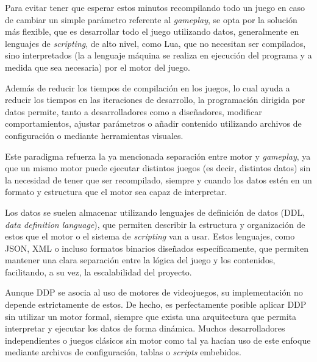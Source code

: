 \smallskip

Para evitar tener que esperar estos minutos recompilando todo un juego en caso de cambiar un simple parámetro referente al \textit{gameplay}, se opta por la solución más flexible, que es desarrollar todo el juego utilizando datos, generalmente en lenguajes de \textit{scripting}, de alto nivel, como Lua, que no necesitan ser compilados, sino interpretados (la  a lenguaje máquina se realiza en ejecución del programa y a medida que sea necesaria) por el motor del juego.

\medskip

Además de reducir los tiempos de compilación en los juegos, lo cual ayuda a reducir los tiempos en las iteraciones de desarrollo, la programación dirigida por datos permite, tanto a desarrolladores como a diseñadores, modificar comportamientos, ajustar parámetros o añadir contenido utilizando archivos de configuración o mediante herramientas visuales.

\medskip

Este paradigma refuerza la ya mencionada separación entre motor y \textit{gameplay}, ya que un mismo motor puede ejecutar distintos juegos (es decir, distintos datos) sin la necesidad de tener que ser recompilado, siempre y cuando los datos estén en un formato y estructura que el motor sea capaz de interpretar.

\medskip

Los datos se suelen almacenar utilizando lenguajes de definición de datos (DDL, \textit{data definition language}), que permiten describir la estructura y organización de estos que el motor o el sistema de \textit{scripting} van a usar. Estos lenguajes, como JSON, XML o incluso formatos binarios diseñados específicamente, que permiten mantener una clara separación entre la lógica del juego y los contenidos, facilitando, a su vez, la escalabilidad del proyecto.

\medskip

Aunque DDP se asocia al uso de motores de videojuegos, su implementación no depende estrictamente de estos. De hecho, es perfectamente posible aplicar DDP sin utilizar un motor formal, siempre que exista una arquitectura que permita interpretar y ejecutar los datos de forma dinámica. Muchos desarrolladores independientes o juegos clásicos sin motor como tal ya hacían uso de este enfoque mediante archivos de configuración, tablas o \textit{scripts} embebidos.

\medskip

